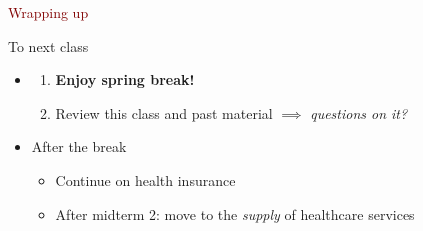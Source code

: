 





\begin{frame}{}
    \begin{center}
    \Large \textcolor{maroon}{Wrapping up}
    \end{center}
\end{frame}
\begin{frame}{To next class}
\begin{itemize}
    \item {}
    \begin{enumerate}
        \item \textbf{Enjoy spring break!}
        \item Review this class and past material $\implies$ \textit{questions on it?}
    \end{enumerate}
    \vspace{5mm}

    \item After the break
    \begin{itemize}
        \item Continue on health insurance
        \item After midterm 2: move to the \textit{supply} of healthcare services 
    \end{itemize}
\end{itemize}
\end{frame}
